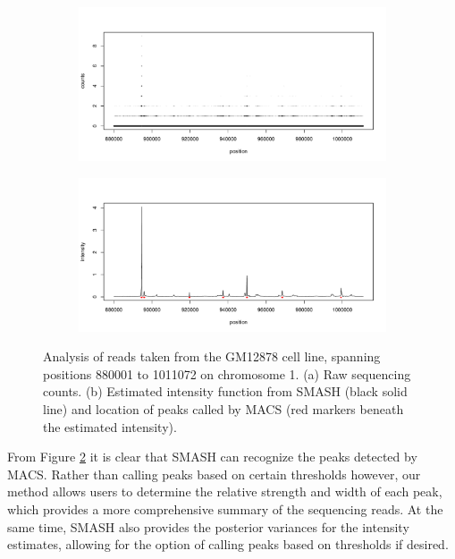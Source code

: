 \documentclass[12pt]{article}
\begin{document}
\begin{figure}
\centering
    \begin{subfigure}[b]{0.85\textwidth}
        \centering
        \includegraphics[width=\textwidth]{peaks_comp_a.pdf}
        \caption{}
        \label{fig:seq_peak_data}
    \end{subfigure}
    \begin{subfigure}[b]{0.85\textwidth}
        \centering
        \includegraphics[width=\textwidth]{peaks_comp_b.pdf}
        \caption{}
        \label{fig:seq_peak_est}
    \end{subfigure}
    \caption{Analysis of reads taken from the GM12878 cell line, spanning positions 880001 to 1011072 on chromosome 1. (a) Raw sequencing counts. (b) Estimated intensity function from SMASH (black solid line) and location of peaks called by MACS (red markers beneath the estimated intensity).}
    \label{fig:seq_peak}
\end{figure}
From Figure \ref{fig:seq_peak_est} it is clear that SMASH can recognize the peaks detected by MACS. Rather than calling peaks based on certain thresholds however, our method allows users to determine the relative strength and width of each peak, which provides a more comprehensive summary of the sequencing reads. At the same time, SMASH also provides the posterior variances for the intensity estimates, allowing for the option of calling peaks based on thresholds if desired.\\
\end{document}

